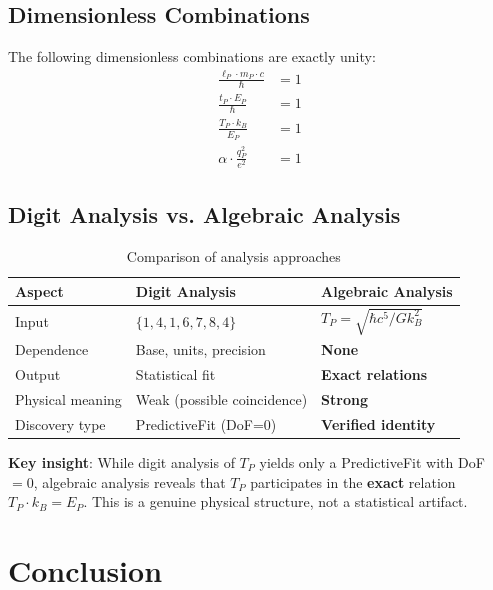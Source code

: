\documentclass[twocolumn,showpacs,preprintnumbers,amsmath,amssymb,prl]{revtex4-2}
\begin{document}
\subsection{Dimensionless Combinations}

The following dimensionless combinations are exactly unity:
\begin{align}
    \frac{\ell_P \cdot m_P \cdot c}{\hbar} &= 1 \\
    \frac{t_P \cdot E_P}{\hbar} &= 1 \\
    \frac{T_P \cdot k_B}{E_P} &= 1 \\
    \alpha \cdot \frac{q_P^2}{e^2} &= 1
\end{align}

\subsection{Digit Analysis vs. Algebraic Analysis}

\begin{table}[h]
\centering
\caption{Comparison of analysis approaches}
\begin{tabular}{@{}lll@{}}
\toprule
Aspect & Digit Analysis & Algebraic Analysis \\
\midrule
Input & $\{1,4,1,6,7,8,4\}$ & $T_P = \sqrt{\hbar c^5/G k_B^2}$ \\
Dependence & Base, units, precision & \textbf{None} \\
Output & Statistical fit & \textbf{Exact relations} \\
Physical meaning & Weak (possible coincidence) & \textbf{Strong} \\
Discovery type & PredictiveFit (DoF=0) & \textbf{Verified identity} \\
\bottomrule
\end{tabular}
\end{table}

\textbf{Key insight}: While digit analysis of $T_P$ yields only a PredictiveFit with DoF $= 0$, algebraic analysis reveals that $T_P$ participates in the \textbf{exact} relation $T_P \cdot k_B = E_P$. This is a genuine physical structure, not a statistical artifact.

\section{Conclusion}
\end{document}
